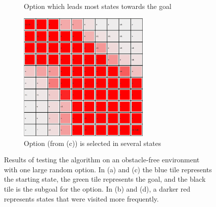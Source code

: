 \documentclass{acm_proc_article-sp}
\begin{document}
\begin{figure}[!htbp]
\begin{subfigure}[h]{.5\textwidth}
    \caption{Option which leads most states towards the goal}
  \end{subfigure}
  \hfill
  \begin{subfigure}[h]{.5\textwidth}
  \centering
    \includegraphics[width=2.5in]{GiantOp2Pol.png}
    \caption{Option (from (c)) is selected in several states}
  \end{subfigure}
  \caption{Results of testing the algorithm on an obstacle-free environment with one large random option. In (a) and (c) the blue tile represents the starting state, the green tile represents the goal, and the black tile is the subgoal for the option. In (b) and (d), a darker red represents states that were visited more frequently.}
  \vspace{20pt}
\end{figure}

\end{document}
